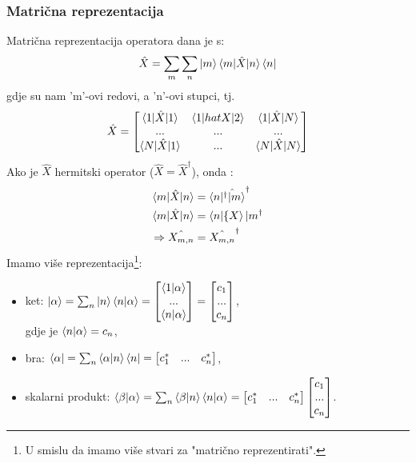 \documentclass{article}
\numberwithin{equation}{section}
\begin{document}
\subsubsection{Matrična reprezentacija}
Matrična reprezentacija operatora dana je s:
\begin{equation}
	\hat{X} = \sum_m\sum_n \ket{m}\braket{m|\hat{X}|n}\bra{n}
\end{equation}
gdje su nam 'm'-ovi redovi, a 'n'-ovi stupci, tj.
\begin{equation}
	\hat{X} =
	\begin{bmatrix}
		\braket{1|\hat{X}|1} & \braket{1|hat{X}|2} & \braket{1|\hat{X}|N} \\
		...                  & ...                 & ...                  \\
		\braket{N|\hat{X}|1} & ...                 & \braket{N|\hat{X}|N}
	\end{bmatrix}
\end{equation}
Ako je $\hat{X}$ hermitski operator ($\hat{X} = \hat{X}^{\dagger}$), onda :
\begin{equation}
	\begin{aligned}
		\braket{m|\hat{X}|n}      & = \braket{n|\hat{^{\dagger}|m}}^{\dagger} \\
		\braket{m|\hat{X}|n}      & = \braket{n|\{X}|m^{\dagger}              \\
		\Rightarrow \hat{X_{m,n}} & = \hat{X_{m,n}}^{\dagger}
	\end{aligned}
\end{equation}
Imamo više reprezentacija\footnote{U smislu da imamo više stvari za "matrično reprezentirati".}:
\begin{itemize}
	\item ket: $\ket{\alpha} = \sum_n\ket{n}\braket{n|\alpha} =
		      \begin{bmatrix} \braket{1|\alpha}\\ ...\\ \braket{n|\alpha} \end{bmatrix}
		      = \begin{bmatrix} c_1\\ ...\\ c_n  \end{bmatrix}$,\\
	      gdje je $\braket{n|\alpha} = c_n$,
	\item bra: $\bra{\alpha} = \sum_n \braket{\alpha|n}\bra{n} = \begin{bmatrix} c_1^* & ... & c_n^* \end{bmatrix}$,
	\item skalarni produkt: $\braket{\beta|\alpha} = \sum_n \braket{\beta|n}\braket{n|\alpha}=
		      \begin{bmatrix} c_1^* & ... & c_n^* \end{bmatrix} \begin{bmatrix} c_1\\ ...\\ c_n  \end{bmatrix}$.
\end{itemize}
\end{document}
